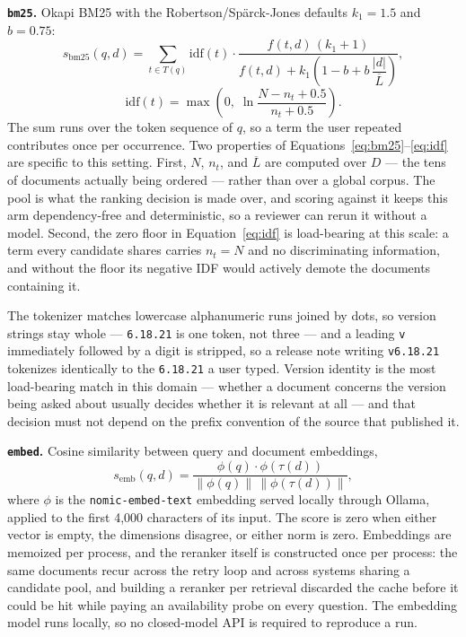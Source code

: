 \textbf{\texttt{bm25}.} Okapi BM25 with the Robertson/Sp\"arck-Jones
defaults $k_1 = 1.5$ and $b = 0.75$:
\begin{equation}
s_{\mathrm{bm25}}(q, d) = \sum_{t \in T(q)} \mathrm{idf}(t) \cdot
\frac{f(t,d)\,(k_1 + 1)}{f(t,d) + k_1\left(1 - b + b\,\dfrac{|d|}{\overline{L}}\right)},
\label{eq:bm25}
\end{equation}
\begin{equation}
\mathrm{idf}(t) = \max\!\left(0,\; \ln \frac{N - n_t + 0.5}{n_t + 0.5}\right).
\label{eq:idf}
\end{equation}
The sum runs over the token sequence of $q$, so a term the user
repeated contributes once per occurrence. Two properties of
Equations~\eqref{eq:bm25}--\eqref{eq:idf} are specific to this setting.
First, $N$, $n_t$, and $\overline{L}$ are computed over $D$ --- the
tens of documents actually being ordered --- rather than over a global
corpus. The pool is what the ranking decision is made over, and scoring
against it keeps this arm dependency-free and deterministic, so a
reviewer can rerun it without a model. Second, the zero floor in
Equation~\eqref{eq:idf} is load-bearing at this scale: a term every
candidate shares carries $n_t = N$ and no discriminating information,
and without the floor its negative IDF would actively demote the
documents containing it.

The tokenizer matches lowercase alphanumeric runs joined by dots, so
version strings stay whole --- \texttt{6.18.21} is one token, not three
--- and a leading \texttt{v} immediately followed by a digit is
stripped, so a release note writing \texttt{v6.18.21} tokenizes
identically to the \texttt{6.18.21} a user typed. Version identity is
the most load-bearing match in this domain --- whether a document
concerns the version being asked about usually decides whether it is
relevant at all --- and that decision must not depend on the prefix
convention of the source that published it.

\textbf{\texttt{embed}.} Cosine similarity between query and document
embeddings,
\begin{equation}
s_{\mathrm{emb}}(q, d) = \frac{\phi(q) \cdot \phi(\tau(d))}{\lVert \phi(q) \rVert \, \lVert \phi(\tau(d)) \rVert},
\label{eq:embed}
\end{equation}
where $\phi$ is the \texttt{nomic-embed-text} embedding served locally
through Ollama, applied to the first 4{,}000 characters of its
input. The score is zero when either vector is empty, the dimensions
disagree, or either norm is zero. Embeddings are memoized per process,
and the reranker itself is constructed once per process: the same
documents recur across the retry loop and across systems sharing a
candidate pool, and building a reranker per retrieval discarded the
cache before it could be hit while paying an availability probe on
every question. The embedding model runs locally, so no closed-model
API is required to reproduce a run.

